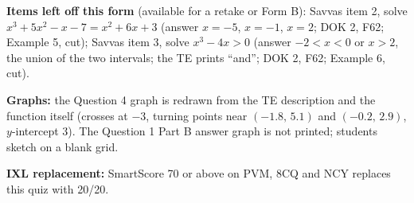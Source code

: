 \documentclass[11pt]{article}
\begin{document}
\textbf{Items left off this form} (available for a retake or Form B): Savvas item 2, solve $x^3+5x^2-x-7=x^2+6x+3$ (answer $x=-5$, $x=-1$, $x=2$; DOK 2, F62; Example 5, cut); Savvas item 3, solve $x^3-4x>0$ (answer $-2<x<0$ or $x>2$, the union of the two intervals; the TE prints ``and''; DOK 2, F62; Example 6, cut).

\textbf{Graphs:} the Question 4 graph is redrawn from the TE description and the function itself (crosses at $-3$, turning points near $(-1.8,\,5.1)$ and $(-0.2,\,2.9)$, $y$-intercept 3). The Question 1 Part B answer graph is not printed; students sketch on a blank grid.

\textbf{IXL replacement:} SmartScore 70 or above on PVM, 8CQ and NCY replaces this quiz with 20/20.
\end{document}
